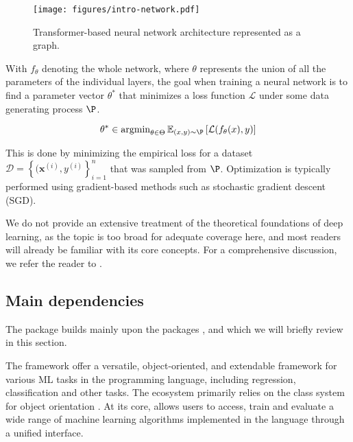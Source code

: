 \documentclass[article]{jss}
\theoremstyle{definition}
\begin{document}
\begin{figure}[h]
    \centering
    \texttt{[image: figures/intro-network.pdf]}
    \caption{Transformer-based neural network architecture represented as a graph.}
    \label{fig:intro-network}
\end{figure}

With $f_\theta$ denoting the whole network, where $\theta$ represents the union of all the parameters of the individual layers, the goal when training a neural network is to find a parameter vector $\theta^*$ that minimizes a loss function $\mathcal{L}$ under some data generating process $\P$.

\begin{equation}
\theta^* \in \operatorname{argmin}_{\theta \in \Theta} \mathbb{E}_{(x, y) \sim \P} \left[ \mathcal{L}(f_{\theta}(x), y) \right]
\end{equation}

This is done by minimizing the empirical loss for a dataset $\mathcal{D} = \left\{ (\mathbf{x}^{(i)}, y^{(i)} \right\}_{i=1}^n$ that was sampled from $\P$.
Optimization is typically performed using gradient-based methods such as stochastic gradient descent (SGD).

We do not provide an extensive treatment of the theoretical foundations of deep learning, as the topic is too broad for adequate coverage here, and most readers will already be familiar with its core concepts. For a comprehensive discussion, we refer the reader to \cite{bishop2023deep}.


\subsection{Main dependencies}

The  \rlang{} package builds mainly upon the \rlang{} packages  \citep{ref-mlr32019},  \citep{ref-mlr3pipelines2021} and  \citep{ref-torch2025} which we will briefly review in this section.

The  framework offer a versatile, object-oriented, and extendable framework for various ML tasks in the  programming language, including regression, classification and other tasks.
The ecosystem primarily relies on the  class system for object orientation \citep{ref-r6chang}.
At its core,  allows users to access, train and evaluate a wide range of machine learning algorithms implemented in the  language through a unified interface.
\end{document}
